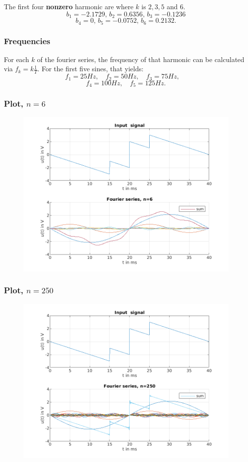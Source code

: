 \documentclass{beamer}
\begin{document}
\begin{frame}
  The first four \textbf{nonzero} harmonic are where $k$ is  $2, 3, 5$ and  $6$.
  \[
    b_{1} = -2.1729, \, b_{2} = 0.6356, \, b_{3} = -0.1236 
  \]
  \[
    b_{4} = 0, \, b_{5} = -0.0752, \, b_{6} = 0.2132
  .\]   
\end{frame}

\begin{frame}
\frametitle{Frequencies}
  For each $k$ of the fourier series, the frequency of that harmonic can be calculated via $f_{k} =
  k \frac{1}{T}$. For the first five sines, that yields:
  \[
    f_{1} = 25Hz, \quad f_{2} = 50Hz, \quad f_{3} = 75Hz, \quad
  \]
  \[
    f_{4} = 100Hz, \quad f_{5} = 125Hz
  .\] 
\end{frame}

\begin{frame}
\frametitle{Plot, $n=6$}
\begin{figure}
  \includegraphics[scale=0.55]{../latex/Figures/fourier_n5.png} 
\end{figure}
\end{frame}

\begin{frame}
\frametitle{Plot, $n=250$}
\begin{figure}
  \includegraphics[scale=0.55]{../latex/Figures/fourier_n250.png} 
\end{figure}
\end{frame}
\end{document}
